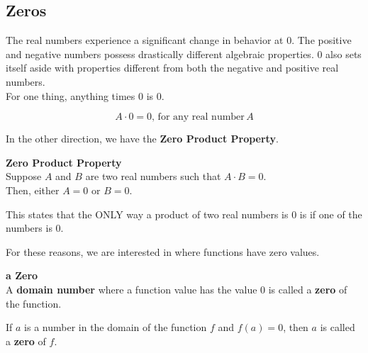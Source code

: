 \documentclass{ximera}
\begin{document}
\subsection*{Zeros}

The real numbers experience a significant change in behavior at $0$.  The positive and negative numbers possess drastically different algebraic properties.  $0$ also sets itself aside with properties different from both the negative and positive real numbers. \\


For one thing, anything times $0$ is $0$.


\[
A \cdot 0 = 0, \, \text{for any real number} \, A
\]

In the other direction, we have the \textbf{\textcolor{purple!85!blue}{Zero Product Property}}.  








\begin{definition}  \textbf{\textcolor{green!50!black}{Zero Product Property}} \\


Suppose $A$ and $B$ are two real numbers such that $A \cdot B = 0$. \\


Then, either $A = 0$ or $B = 0$.




\end{definition}









This states that the ONLY way a product of two real numbers is $0$ is if one of the numbers is $0$.

For these reasons, we are interested in where functions have zero values.






\begin{definition}  \textbf{\textcolor{green!50!black}{a Zero}} \\


A \textbf{domain number} where a function value has the value $0$ is called a \textbf{zero} of the function.


\begin{center}
If $a$ is a number in the domain of the function $f$ and $f(a) = 0$, then $a$ is called a \textbf{zero} of $f$.
\end{center}


\end{definition}
\end{document}
